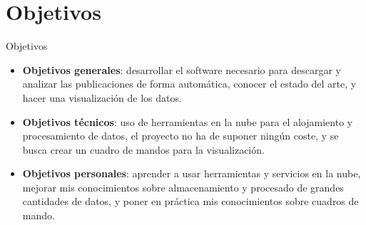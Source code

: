 \documentclass[aspectratio=149]{beamer}
\begin{document}
\section{Objetivos}
\begin{frame}[label=objetivos]{Objetivos}
    \begin{itemize}
        \item \textbf{Objetivos generales}: desarrollar el software necesario para descargar y analizar las publicaciones de forma automática, conocer el estado del arte, y hacer una visualización de los datos.
        \item \textbf{Objetivos técnicos}: uso de herramientas en la nube para el alojamiento y procesamiento de datos, el proyecto no ha de suponer ningún coste, y se busca crear un cuadro de mandos para la visualización.
        \item \textbf{Objetivos personales}: aprender a usar herramientas y servicios en la nube, mejorar mis conocimientos sobre almacenamiento y procesado de grandes cantidades de datos, y poner en práctica mis conocimientos sobre cuadros de mando.
    \end{itemize}
\end{frame}

\end{document}
